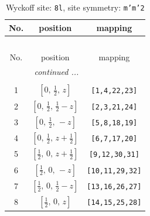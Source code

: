 \documentclass[fleqn,8pt]{jsarticle}
\begin{document}
\begin{longtable}{ccc}
\caption{Wyckoff site: {\tt 8l}, site symmetry: {\tt m'm'2}}
 \\
 \hline \hline
No. & position & mapping \\ \hline \endfirsthead

\multicolumn{2}{l}{\tablename\ \thetable{}} \\
 \hline \hline
No. & position & mapping \\ \hline \endhead

 \hline \hline
\multicolumn{2}{r}{\footnotesize\it continued ...} \\ \endfoot

 \hline \hline
\multicolumn{2}{r}{} \\ \endlastfoot

1 & $\left[ 0,\, \frac{1}{2},\, z \right]$ & {\tt [1,4,22,23]} \\ \hline
2 & $\left[ 0,\, \frac{1}{2},\, \frac{1}{2} - z \right]$ & {\tt [2,3,21,24]} \\ \hline
3 & $\left[ 0,\, \frac{1}{2},\, - z \right]$ & {\tt [5,8,18,19]} \\ \hline
4 & $\left[ 0,\, \frac{1}{2},\, z + \frac{1}{2} \right]$ & {\tt [6,7,17,20]} \\ \hline
5 & $\left[ \frac{1}{2},\, 0,\, z + \frac{1}{2} \right]$ & {\tt [9,12,30,31]} \\ \hline
6 & $\left[ \frac{1}{2},\, 0,\, - z \right]$ & {\tt [10,11,29,32]} \\ \hline
7 & $\left[ \frac{1}{2},\, 0,\, \frac{1}{2} - z \right]$ & {\tt [13,16,26,27]} \\ \hline
8 & $\left[ \frac{1}{2},\, 0,\, z \right]$ & {\tt [14,15,25,28]} \\
\end{longtable}
\renewcommand{\arraystretch}{1.2}
\end{document}
